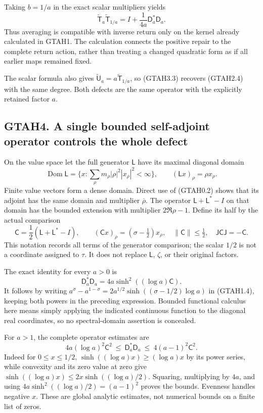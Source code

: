 Taking \(b=1/a\) in the exact scalar multipliers yields \[
\boxed{\widetilde{\mathsf T}_a\widetilde{\mathsf T}_{1/a}
=I+\frac1{4a}\mathsf D_a^*\mathsf D_a.}
\tag{GTAH3.3}
\] Thus averaging is compatible with inverse return only on the kernel
already calculated in GTAH1. The calculation connects the positive
repair to the complete return action, rather than treating a changed
quadratic form as if all earlier maps remained fixed.

The scalar formula also gives
\(\widetilde{\mathsf U}_a=a\widetilde{\mathsf T}_{1/a}\), so (GTAH3.3)
recovers (GTAH2.4) with the same degree. Both defects are the same
operator with the explicitly retained factor \(a\).

\subsection{GTAH4. A single bounded self-adjoint operator controls the
whole
defect}\label{gtah4.-a-single-bounded-self-adjoint-operator-controls-the-whole-defect}

On the value space let the full generator \(\mathsf L\) have its maximal
diagonal domain \[
\operatorname{Dom}\mathsf L
=\{x:\sum_\rho m_\rho|\rho|^2|x_\rho|^2<\infty\},
\qquad (\mathsf Lx)_\rho=\rho x_\rho.
\tag{GTAH4.1}
\] Finite value vectors form a dense domain. Direct use of (GTAH0.2)
shows that its adjoint has the same domain and multiplier
\(\overline\rho\). The operator \(\mathsf L+\mathsf L^*-I\) on that
domain has the bounded extension with multiplier \(2\Re\rho-1\). Define
its half by the actual comparison \[
\mathsf C=\frac12(\mathsf L+\mathsf L^*-I),\qquad
(\mathsf Cx)_\rho=(\sigma-\tfrac12)x_\rho,
\quad \|\mathsf C\|\le\tfrac12,
\quad \mathsf J\mathsf C\mathsf J=-\mathsf C.
\tag{GTAH4.2}
\] This notation records all terms of the generator comparison; the
scalar \(1/2\) is not a coordinate assigned to \(\tau\). It does not
replace \(\mathsf L\), \(\zeta\), or their original factors.

The exact identity for every \(a>0\) is \[
\mathsf D_a^*\mathsf D_a
=4a\sinh^2((\log a)\mathsf C).
\tag{GTAH4.3}
\] It follows by writing \(a^\sigma-a^{1-\sigma}
=2a^{1/2}\sinh((\sigma-1/2)\log a)\) in (GTAH1.4), keeping both powers
in the preceding expression. Bounded functional calculus here means
simply applying the indicated continuous function to the diagonal real
coordinates, so no spectral-domain assertion is concealed.

For \(a>1\), the complete operator estimates are \[
4a(\log a)^2\mathsf C^2
\ \le\ \mathsf D_a^*\mathsf D_a
\ \le\ 4(a-1)^2\mathsf C^2.
\tag{GTAH4.4}
\] Indeed for \(0\le x\le1/2\), \(\sinh((\log a)x)\ge(\log a)x\) by its
power series, while convexity and its zero value at zero give
\(\sinh((\log a)x)\le 2x\sinh((\log a)/2)\). Squaring, multiplying by
\(4a\), and using \(4a\sinh^2((\log a)/2)=(a-1)^2\) proves the bounds.
Evenness handles negative \(x\). These are global analytic estimates,
not numerical bounds on a finite list of zeros.

